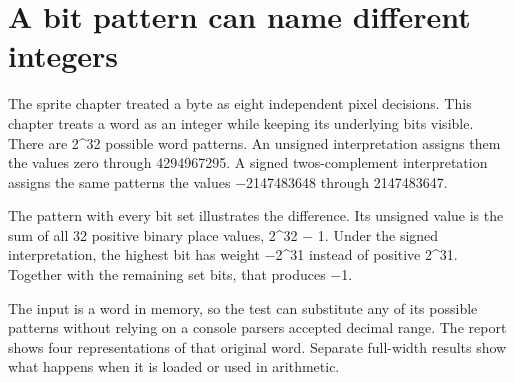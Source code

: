 \section{A bit pattern can name different
  integers}\label{004-bit-inspector-p00-a-bit-pattern-can-name-different-integers}

The sprite chapter treated a byte as eight independent pixel decisions.
This chapter treats a word as an integer while keeping its underlying
bits visible. There are 2\^{}32 possible word patterns. An unsigned
interpretation assigns them the values zero through 4294967295. A signed
two\textquotesingle s-complement interpretation assigns the same
patterns the values \ensuremath{-}2147483648 through 2147483647.

The pattern with every bit set illustrates the difference. Its unsigned
value is the sum of all 32 positive binary place values, 2\^{}32 \ensuremath{-} 1.
Under the signed interpretation, the highest bit has weight \ensuremath{-}2\^{}31
instead of positive 2\^{}31. Together with the remaining set bits, that
produces \ensuremath{-}1.

The input is a word in memory, so the test can substitute any of its
possible patterns without relying on a console parser\textquotesingle s
accepted decimal range. The report shows four representations of that
original word. Separate full-width results show what happens when it is
loaded or used in arithmetic.
